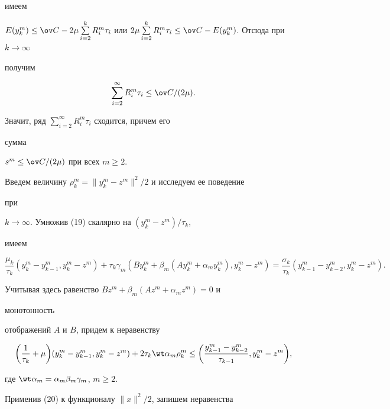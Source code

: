 имеем


$E(y_k^m)\leq \ov C-2\mu \sum\limits_{i=2}^kR_i^m\tau_i$ или $2\mu


\sum\limits_{i=2}^k


R_i^m\tau_i\leq \ov C-E(y_k^m)$. Отсюда при $k\rightarrow \infty $


получим


\begin{equation}\label {22}


\sum_{i=2}^{\infty }R_i^m\tau_i\leq \ov C/(2\mu ).


\end{equation}


Значит, ряд $\sum\limits_{i=2}^{\infty }R_i^m\tau_i$ сходится, причем его


сумма


$s^m \leq \ov C/(2\mu )$ при всех $m\geq 2$.


Введем величину $\rho_k^m=\|y_k^m-z^m\|^2/2$ и исследуем ее поведение


при


$k\rightarrow \infty $. Умножив (19) скалярно на $(y_k^m-z^m)/\tau_k$,


имеем


$$\frac {\mu_k}{\tau_k}(y_k^m-y_{k-1}^m,y_k^m-z^m)+


\tau_k\gamma_m(By_k^m+


\beta_m(Ay_k^m+\alpha_my_k^m),y_k^m-z^m)=\frac{\sigma_k}


{\tau_k}(y_{k-1}^m-y_{k-2}^m,y_k^m-z^m).


$$


Учитывая здесь равенство $Bz^m+\beta_m(Az^m+\alpha_mz^m)=0$ и


монотонность


отображений $A$ и $B$, придем к неравенству


\begin{equation}\label {23}


\bigg(\frac {1}{\tau_k}+\mu \bigg)(y_k^m-y_{k-1}^m,y_k^m-z^m)+


2\tau_k\wt\alpha_m


\rho_k^m \leq \bigg(\frac{y_{k-1}^m-y_{k-2}^m}{\tau_{k-1}},y_k^m-z^m\bigg),


\end{equation}


где $\wt \alpha_m =\alpha_m\beta_m\gamma_m$, $m \geq 2$.





Применив (20) к функционалу $\|x\|^2/2$, запишем неравенства


